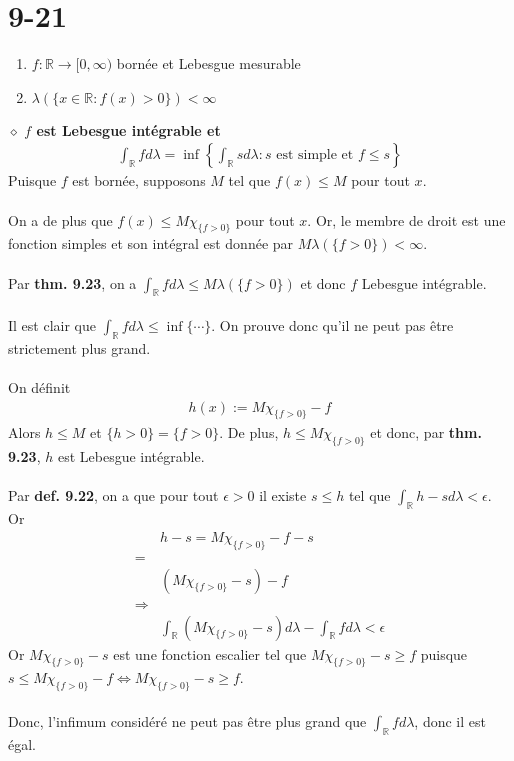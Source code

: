 \documentclass[a4paper,10pt]{article}
\begin{document}
\section*{9-21}
\begin{enumerate}
	\item $f : \mathbb{R} \rightarrow [0, \infty)$ bornée et Lebesgue mesurable
	\item $\lambda \left( \{ x \in \mathbb{R} : f(x) > 0 \} \right) < \infty$
\end{enumerate}
$\diamond$ \textbf{$f$ est Lebesgue intégrable et }
\begin{align*}
	\int_\mathbb{R} f d \lambda = \inf \left \{ \int_\mathbb{R} s d \lambda : s \text{ est simple et } f \leq s \right \}
\end{align*}
Puisque $f$ est bornée, supposons $M$ tel que $f(x) \leq M$ pour tout $x$.
\\
\\
On a de plus que $f(x) \leq M \chi_{\{f > 0\}}$ pour tout $x$. Or, le membre de droit est une fonction simples et son intégral est donnée par $M \lambda ( \{f > 0 \} ) < \infty$.
\\
\\
Par \textbf{thm. 9.23}, on a $\int_\mathbb{R} f d\lambda \leq M \lambda ( \{f > 0 \} )$ et donc $f$ Lebesgue intégrable.
\\
\\
Il est clair que $\int_\mathbb{R} f d\lambda \leq \inf \{ \cdots \}$. On prouve donc qu'il ne peut pas être strictement plus grand.
\\
\\
On définit
\begin{align*}
	h(x) := M \chi_{\{f > 0\}} - f
\end{align*}
Alors $h \leq M$ et $\{h > 0\} = \{f > 0\}$. De plus, $h \leq M\chi_{\{f > 0\}}$ et donc, par \textbf{thm. 9.23}, $h$ est Lebesgue intégrable.
\\
\\
Par \textbf{def. 9.22}, on a que pour tout $\epsilon > 0$ il existe $s \leq h$ tel que $\int_\mathbb{R} h -s d\lambda < \epsilon$. Or
\begin{align*}
	& h - s = M\chi_{\{f > 0\}} - f - s \\
	= \\
	& (M\chi_{\{f > 0\}} - s) - f \\
	\Rightarrow \\
	& \int_\mathbb{R} (M \chi_{\{f > 0\}} - s)d\lambda - \int_\mathbb{R} f d\lambda < \epsilon
\end{align*}
Or $M\chi_{\{f > 0 \}} - s$ est une fonction escalier tel que $M\chi_{\{f > 0\}} - s \geq f$ puisque $s \leq M\chi_{\{f > 0\}} - f \Leftrightarrow M\chi_{\{f > 0\}} - s \geq f$.
\\
\\
Donc, l'infimum considéré ne peut pas être plus grand que $\int_\mathbb{R} f d\lambda$, donc il est égal.
\end{document}
